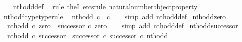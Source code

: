 \begin{isabellebody}
%
\isadelimproof
\ \ %
\endisadelimproof
%
\isatagproof
{}\isamarkupfalse%
\ nth{\isacharunderscore}{\kern0pt}odd{\isacharunderscore}{\kern0pt}def\ \isamarkupfalse%
\ {\isacharparenleft}{\kern0pt}rule\ theI{\isacharprime}{\kern0pt}{\isacharcomma}{\kern0pt}\ etcs{\isacharunderscore}{\kern0pt}rule\ natural{\isacharunderscore}{\kern0pt}number{\isacharunderscore}{\kern0pt}object{\isacharunderscore}{\kern0pt}property{}{\isacharparenright}{\kern0pt}%
\endisatagproof
{\isafoldproof}%
%
\isadelimproof
\isanewline
%
\endisadelimproof
\isanewline
{}\isamarkupfalse%
\ nth{\isacharunderscore}{\kern0pt}odd{\isacharunderscore}{\kern0pt}type{\isacharbrackleft}{\kern0pt}type{\isacharunderscore}{\kern0pt}rule{\isacharbrackright}{\kern0pt}{\isacharcolon}{\kern0pt}\isanewline
\ \ {\isachardoublequoteopen}nth{\isacharunderscore}{\kern0pt}odd{\isacharcolon}{\kern0pt}\ {\isasymnat}\isactrlsub c\ {\isasymrightarrow}\ {\isasymnat}\isactrlsub c{\isachardoublequoteclose}\isanewline
%
\isadelimproof
\ \ %
\endisadelimproof
%
\isatagproof
{}\isamarkupfalse%
\ {\isacharparenleft}{\kern0pt}simp\ add{\isacharcolon}{\kern0pt}\ nth{\isacharunderscore}{\kern0pt}odd{\isacharunderscore}{\kern0pt}def{}{\isacharparenright}{\kern0pt}%
\endisatagproof
{\isafoldproof}%
%
\isadelimproof
\isanewline
%
\endisadelimproof
\isanewline
{}\isamarkupfalse%
\ nth{\isacharunderscore}{\kern0pt}odd{\isacharunderscore}{\kern0pt}zero{\isacharcolon}{\kern0pt}\isanewline
\ \ {\isachardoublequoteopen}nth{\isacharunderscore}{\kern0pt}odd\ {\isasymcirc}\isactrlsub c\ zero\ {\isacharequal}{\kern0pt}\ successor\ {\isasymcirc}\isactrlsub c\ zero{\isachardoublequoteclose}\isanewline
%
\isadelimproof
\ \ %
\endisadelimproof
%
\isatagproof
{}\isamarkupfalse%
\ {\isacharparenleft}{\kern0pt}simp\ add{\isacharcolon}{\kern0pt}\ nth{\isacharunderscore}{\kern0pt}odd{\isacharunderscore}{\kern0pt}def{}{\isacharparenright}{\kern0pt}%
\endisatagproof
{\isafoldproof}%
%
\isadelimproof
\isanewline
%
\endisadelimproof
\isanewline
{}\isamarkupfalse%
\ nth{\isacharunderscore}{\kern0pt}odd{\isacharunderscore}{\kern0pt}successor{\isacharcolon}{\kern0pt}\isanewline
\ \ {\isachardoublequoteopen}nth{\isacharunderscore}{\kern0pt}odd\ {\isasymcirc}\isactrlsub c\ successor\ {\isacharequal}{\kern0pt}\ {\isacharparenleft}{\kern0pt}successor\ {\isasymcirc}\isactrlsub c\ successor{\isacharparenright}{\kern0pt}\ {\isasymcirc}\isactrlsub c\ nth{\isacharunderscore}{\kern0pt}odd{\isachardoublequoteclose}\isanewline

\end{isabellebody}
